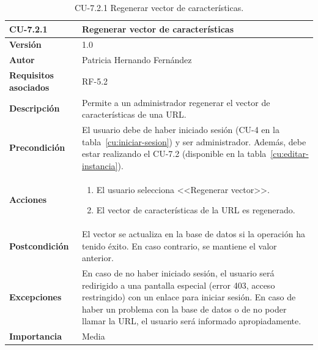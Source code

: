 \begin{table}[p]
	\centering
	\begin{tabularx}{\linewidth}{ p{} p{} }
		\toprule
		\textbf{CU-7.2.1}    & \textbf{Regenerar vector de características}\\
		\toprule
		\textbf{Versión}              & 1.0    \\
		\textbf{Autor}                & Patricia Hernando Fernández \\
		\textbf{Requisitos asociados} & RF-5.2 \\
		\textbf{Descripción}          & Permite a un administrador regenerar el vector de características de una URL.\\
		\textbf{Precondición}         & El usuario debe de haber iniciado sesión (CU-4 en la tabla~\ref{cu:iniciar-sesion}) y ser administrador. Además, debe estar realizando el CU-7.2 (disponible en la tabla~\ref{cu:editar-instancia}). \\
		\textbf{Acciones}             &
		\begin{enumerate}
			\def\labelenumi{\arabic{enumi}.}
			\tightlist
			\item El usuario selecciona <<Regenerar vector>>.
			\item El vector de características de la URL es regenerado.
		\end{enumerate}\\
		\textbf{Postcondición}        & El vector se actualiza en la base de datos si la operación ha tenido éxito. En caso contrario, se mantiene el valor anterior. \\
		\textbf{Excepciones}          & En caso de no haber iniciado sesión, el usuario será redirigido a una pantalla especial (error 403, acceso restringido) con un enlace para iniciar sesión. En caso de haber un problema con la base de datos o de no poder llamar la URL, el usuario será informado apropiadamente.\\
		\textbf{Importancia}          & Media \\
		\bottomrule
	\end{tabularx}
	\caption{CU-7.2.1 Regenerar vector de características.}
	\label{cu:regenerar-vector}
\end{table}


